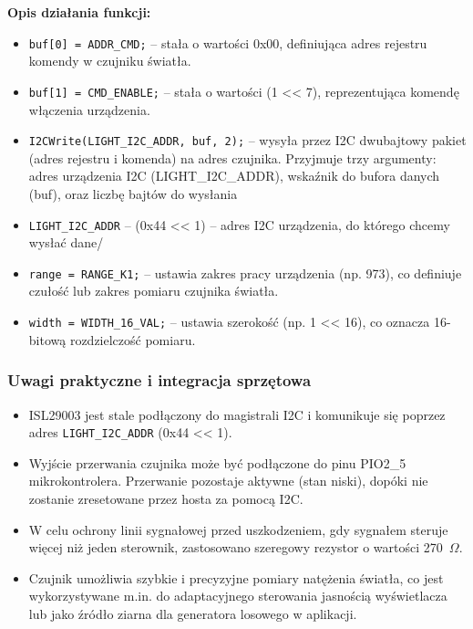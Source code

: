 \documentclass[a4paper,12pt]{report}
\begin{document}
\textbf{Opis działania funkcji:}
\begin{itemize}
    \item \texttt{buf[0] = ADDR\_CMD;} – stała o wartości 0x00, definiująca adres rejestru komendy w czujniku światła.
    \item \texttt{buf[1] = CMD\_ENABLE;} – stała o wartości (1 << 7), reprezentująca komendę włączenia urządzenia.
    \item \texttt{I2CWrite(LIGHT\_I2C\_ADDR, buf, 2);} – wysyła przez I2C dwubajtowy pakiet (adres rejestru i komenda) na adres czujnika. Przyjmuje trzy argumenty: adres urządzenia I2C (LIGHT\_I2C\_ADDR), wskaźnik do bufora danych (buf), oraz liczbę bajtów do wysłania
    \item \texttt{LIGHT\_I2C\_ADDR} – (0x44 << 1) – adres I2C urządzenia, do którego chcemy wysłać dane/
    \item \texttt{range = RANGE\_K1;} – ustawia zakres pracy urządzenia (np. 973), co definiuje czułość lub zakres pomiaru czujnika światła.
    \item \texttt{width = WIDTH\_16\_VAL;} – ustawia szerokość (np. 1 << 16), co oznacza 16-bitową rozdzielczość pomiaru.
\end{itemize}

\subsubsection*{Uwagi praktyczne i integracja sprzętowa}

\begin{itemize}
    \item ISL29003 jest stale podłączony do magistrali I2C i komunikuje się poprzez adres \texttt{LIGHT\_I2C\_ADDR} (0x44 << 1).
    \item Wyjście przerwania czujnika może być podłączone do pinu PIO2\_5 mikrokontrolera. Przerwanie pozostaje aktywne (stan niski), dopóki nie zostanie zresetowane przez hosta za pomocą I2C.
    \item W celu ochrony linii sygnałowej przed uszkodzeniem, gdy sygnałem steruje więcej niż jeden sterownik, zastosowano szeregowy rezystor o wartości 270~$\Omega$.
    \item Czujnik umożliwia szybkie i precyzyjne pomiary natężenia światła, co jest wykorzystywane m.in. do adaptacyjnego sterowania jasnością wyświetlacza lub jako źródło ziarna dla generatora losowego w aplikacji.
\end{itemize}
\end{document}
